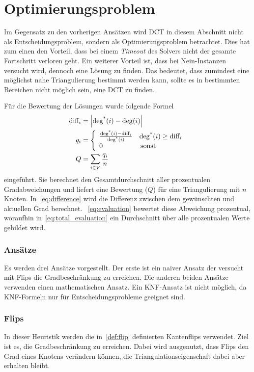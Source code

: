 \section{Optimierungsproblem}
\label{sec:optimierungsproblem}
Im Gegensatz zu den vorherigen Ansätzen wird DCT in diesem Abschnitt nicht als Entscheidungsproblem, sondern als Optimierungsproblem betrachtet.
Dies hat zum einen den Vorteil, dass bei einem \emph{Timeout} des Solvers nicht der gesamte Fortschritt verloren geht.
Ein weiterer Vorteil ist, dass bei Nein-Instanzen versucht wird, dennoch eine Lösung zu finden.
Das bedeutet, dass zumindest eine möglichst nahe Triangulierung bestimmt werden kann, sollte es in bestimmten Bereichen nicht möglich sein, eine DCT zu finden.

Für die Bewertung der Lösungen wurde folgende Formel 
\begin{align}
 \text{diff}_i &= \left| \operatorname{deg^*}(i) - \operatorname{deg}(i) \right| \label{eq:difference} \\
q_i &= \left\{
\begin{array}{ll}
\frac{\operatorname{deg^*}(i) - \text{diff}_i}{\operatorname{deg^*}(i)} & \operatorname{deg^*}(i) \geq \text{diff}_i \\
0 & \, \textrm{sonst} \\
\end{array}
\right. \label{eq:evaluation}\\
Q &= \sum_{i \in V} \frac{q_i}{n} \label{eq:total_evaluation}
\end{align}
eingeführt. Sie berechnet den Gesamtdurchschnitt aller prozentualen Gradabweichungen und liefert eine Bewertung (\(Q\)) für eine Triangulierung mit \(n\) Knoten.
In~\cref{eq:difference} wird die Differenz zwischen dem gewünschten und aktuellen Grad berechnet.
~\cref{eq:evaluation} bewertet diese Abweichung prozentual, woraufhin in~\cref{eq:total_evaluation} ein Durchschnitt über alle prozentualen Werte gebildet wird.

\subsubsection{Ansätze}
Es werden drei Ansätze vorgestellt.
Der erste ist ein naiver Ansatz der versucht mit Flips die Gradbeschränkung zu erreichen.
Die anderen beiden Ansätze verwenden einen mathematischen Ansatz.
Ein KNF-Ansatz ist nicht möglich, da KNF-Formeln nur für Entscheidungsprobleme geeignet sind.

\subsubsection{Flips}
\label{sec:flips}
In dieser Heuristik werden die in~\cref{def:flip} definierten Kantenflips verwendet. 
Ziel ist es, die Gradbeschränkung zu erreichen. 
Dabei wird ausgenutzt, dass Flips den Grad eines Knotens verändern können, die Triangulationseigenschaft dabei aber erhalten bleibt. 

